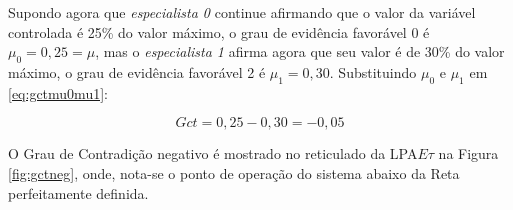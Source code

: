 \begin{itemize}
Supondo agora que 
\emph{especialista 0} continue afirmando  que 
o valor da variável controlada é 25\% do valor máximo,
o grau de evidência favorável 0 é $\mu_0 = 0,25 = \mu$, 
mas o \emph{especialista 1} afirma agora que
seu valor é de 30\% do valor máximo,
o grau de evidência favorável 2 é $\mu_1 = 0,30$.
Substituindo $\mu_0$ e $\mu_1$ em \ref{eq:gctmu0mu1}:

\begin{equation}
Gct = 0,25 - 0,30 = -0,05
\end{equation}

O Grau de Contradição negativo é mostrado no 
reticulado da LPA$E\tau$ na Figura \ref{fig:gctneg},
onde, nota-se o ponto de operação do sistema
abaixo da Reta perfeitamente definida.


\end{itemize}






